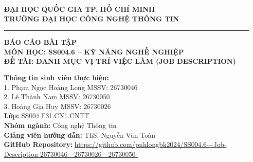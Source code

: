 \documentclass[12pt,a4paper]{article}
\begin{document}
\begin{titlepage}
    \begin{center}
        \textbf{\Large ĐẠI HỌC QUỐC GIA TP. HỒ CHÍ MINH}\\
        \textbf{\Large TRƯỜNG ĐẠI HỌC CÔNG NGHỆ THÔNG TIN}\\
        \vspace{0.5cm}
        \rule{0.8\linewidth}{1pt}
        
        \vspace{2.5cm}
        
        \textbf{\huge BÁO CÁO BÀI TẬP}\\
        \vspace{0.5cm}
        \textbf{\Large MÔN HỌC: SS004.6 -- KỸ NĂNG NGHỀ NGHIỆP}\\
        \vspace{0.3cm}
        \textbf{\Large ĐỀ TÀI: DANH MỤC VỊ TRÍ VIỆC LÀM (JOB DESCRIPTION)}
        
        \vspace{2.5cm}
    \end{center}
    
    \begin{flushleft}
        \hspace{1.5cm} \textbf{\large Thông tin sinh viên thực hiện:} \\
        \vspace{0.3cm}
        \hspace{2.0cm} 1. Phạm Ngọc Hoàng Long \hfill MSSV: 26730046 \hspace{1.5cm} \\
        \vspace{0.2cm}
        \hspace{2.0cm} 2. Lê Thành Nam \hfill MSSV: 26730050 \hspace{1.5cm} \\
        \vspace{0.2cm}
        \hspace{2.0cm} 3. Hoàng Gia Huy \hfill MSSV: 26730026 \hspace{1.5cm} \\
        
        \vspace{1cm}
        \hspace{1.5cm} \textbf{Lớp:} SS004.F31.CN1.CNTT \\
        \vspace{0.2cm}
        \hspace{1.5cm} \textbf{Nhóm ngành:} Công nghệ Thông tin \\
        \vspace{0.2cm}
        \hspace{1.5cm} \textbf{Giảng viên hướng dẫn:} ThS. Nguyễn Văn Toàn \\
        \vspace{0.2cm}
        \hspace{1.5cm} \textbf{GitHub Repository:} \url{https://github.com/pnhlongbk2024/SS004.6---Job-Description-26730046---26730026---26730050-}
    \end{flushleft}
    

\end{titlepage}
\end{document}
